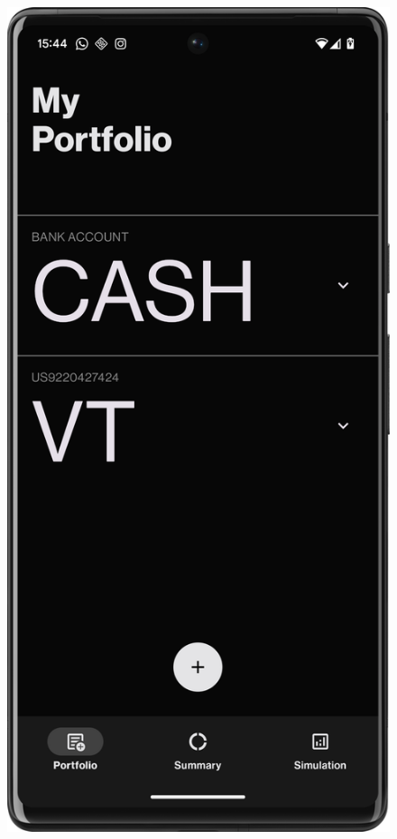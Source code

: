 \documentclass{article}
\begin{document}
\begin{figure}[H]
\begin{minipage}{0.24\textwidth}
        \label{fig:google_clock}
    \end{minipage}
    \hfill
    \begin{minipage}{0.24\textwidth}
        \centering
        \includegraphics[width=\textwidth]{foto/portfolio_screen}

\end{minipage}
\end{figure}
\end{document}
